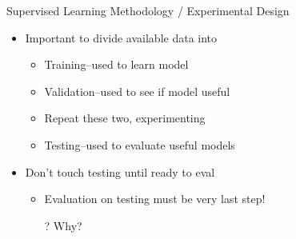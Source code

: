 \documentclass[aspectratio=169]{beamer}
\begin{document}
\begin{frame}{Supervised Learning Methodology / Experimental Design}

\begin{itemize}
\item Important to divide available data into 
	\begin{itemize}
	\item Training--used to learn model
	\item Validation--used to see if model useful
	\item Repeat these two, experimenting
	\item Testing--used to evaluate useful models
	\end{itemize}
\item Don't touch testing until ready to eval
	\begin{itemize}
	\item Evaluation on testing must be very last step!
	\item[?] Why?
	\end{itemize}
\end{itemize}
\end{frame}
\end{document}
